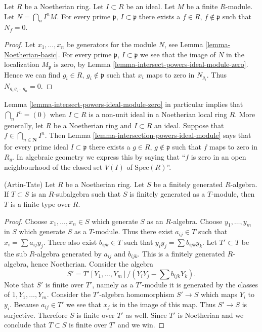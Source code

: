 \begin{lemma}
\label{lemma-intersection-powers-ideal-module}
Let $R$ be a Noetherian ring.
Let $I \subset R$ be an ideal.
Let $M$ be a finite $R$-module.
Let $N = \bigcap_n I^n M$.
For every prime $\mathfrak p$,
$I \subset \mathfrak p$ there
exists a $f \in R$, $f \not \in \mathfrak p$
such that $N_f = 0$.
\end{lemma}

\begin{proof}
Let $x_1, \ldots, x_n$ be generators for the module $N$,
see Lemma \ref{lemma-Noetherian-basic}. For every prime
$\mathfrak p$, $I \subset \mathfrak p$ we see that
the image of $N$ in the localization $M_{\mathfrak p}$
is zero, by Lemma \ref{lemma-intersect-powers-ideal-module-zero}.
Hence we can find $g_i \in R$, $g_i \not \in \mathfrak p$
such that $x_i$ maps to zero in $N_{g_i}$. Thus
$N_{g_1g_2\ldots g_n} = 0$.
\end{proof}

\begin{remark}
\label{remark-intersection-powers-ideal}
Lemma \ref{lemma-intersect-powers-ideal-module-zero}
in particular implies that $\bigcap_n I^n = (0)$
when $I \subset R$ is a non-unit ideal in a Noetherian
local ring $R$. More generally, let $R$ be a Noetherian ring and
$I \subset R$ an ideal. Suppose that $f \in \bigcap_{n \in \mathbf{N}} I^n$.
Then Lemma \ref{lemma-intersection-powers-ideal-module}
says that for every prime ideal $I \subset \mathfrak p$
there exists a $g \in R$, $g \not \in \mathfrak p$
such that $f$ maps to zero in $R_g$. In algebraic geometry we
express this by saying that ``$f$ is zero in an open neighbourhood
of the closed set $V(I)$ of $\text{Spec}(R)$''.
\end{remark}

\begin{lemma}
\label{lemma-Artin-Tate}
(Artin-Tate) Let $R$ be a Noetherian ring. Let $S$ be a finitely
generated $R$-algebra. If $T \subset S$ is an $R$-subalgebra such
that $S$ is finitely generated as a $T$-module, then $T$ is a
finite type over $R$.
\end{lemma}

\begin{proof}
Choose $x_1, \ldots, x_n \in S$ which generate $S$ as an $R$-algebra.
Choose $y_1, \ldots, y_m$ in $S$ which generate $S$ as a $T$-module.
Thus there exist $a_{ij} \in T$ such that
$x_i = \sum a_{ij} y_j$. There also exist $b_{ijk} \in T$ such
that $y_i y_j = \sum b_{ijk} y_k$. Let $T' \subset T$ be the
sub $R$-algebra generated by $a_{ij}$ and $b_{ijk}$. This is a finitely
generated $R$-algebra, hence Noetherian. Consider the algebra
$$
S' = T'[Y_1, \ldots, Y_m]/(Y_i Y_j - \sum b_{ijk} Y_k).
$$
Note that $S'$ is finite over $T'$, namely as a $T'$-module it is
generated by the classes of $1, Y_1, \ldots, Y_m$.
Consider the $T'$-algebra homomorphism $S' \to S$ which maps
$Y_i$ to $y_i$. Because $a_{ij} \in T'$ we see that $x_j$ is
in the image of this map. Thus $S' \to S$ is surjective.
Therefore $S$ is finite over $T'$ as well. Since $T'$ is Noetherian
and we conclude that $T \subset S$ is finite over $T'$ and
we win.
\end{proof}

